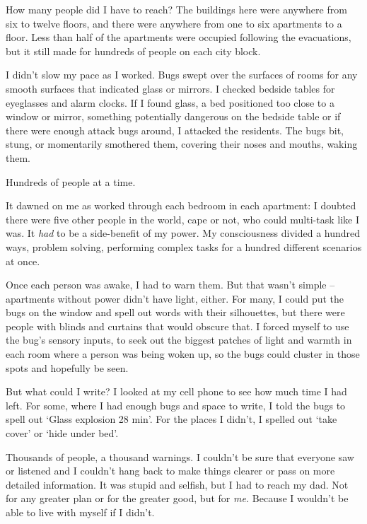 How many people did I have to reach?  The buildings here were anywhere from six to twelve floors, and there were anywhere from one to six apartments to a floor.  Less than half of the apartments were occupied following the evacuations, but it still made for hundreds of people on each city block.



I didn't slow my pace as I worked.  Bugs swept over the surfaces of rooms for any smooth surfaces that indicated glass or mirrors.  I checked bedside tables for eyeglasses and alarm clocks.  If I found glass, a bed positioned too close to a window or mirror, something potentially dangerous on the bedside table or if there were enough attack bugs around, I attacked the residents.  The bugs bit, stung, or momentarily smothered them, covering their noses and mouths, waking them.



Hundreds of people at a time.



It dawned on me as worked through each bedroom in each apartment: I doubted there were five other people in the world, cape or not, who could multi-task like I was.  It \emph{had} to be a side-benefit of my power.  My consciousness divided a hundred ways, problem solving, performing complex tasks for a hundred different scenarios at once.



Once each person was awake, I had to warn them.  But that wasn't simple – apartments without power didn't have light, either.  For many, I could put the bugs on the window and spell out words with their silhouettes, but there were people with blinds and curtains that would obscure that.  I forced myself to use the bug's sensory inputs, to seek out the biggest patches of light and warmth in each room where a person was being woken up, so the bugs could cluster in those spots and hopefully be seen.



But what could I write?  I looked at my cell phone to see how much time I had left. For some, where I had enough bugs and space to write, I told the bugs to spell out `Glass explosion 28 min'.  For the places I didn't, I spelled out `take cover' or `hide under bed'.



Thousands of people, a thousand warnings.  I couldn't be sure that everyone saw or listened and I couldn't hang back to make things clearer or pass on more detailed information.  It was stupid and selfish, but I had to reach my dad.  Not for any greater plan or for the greater good, but for \emph{me.}  Because I wouldn't be able to live with myself if I didn't.



